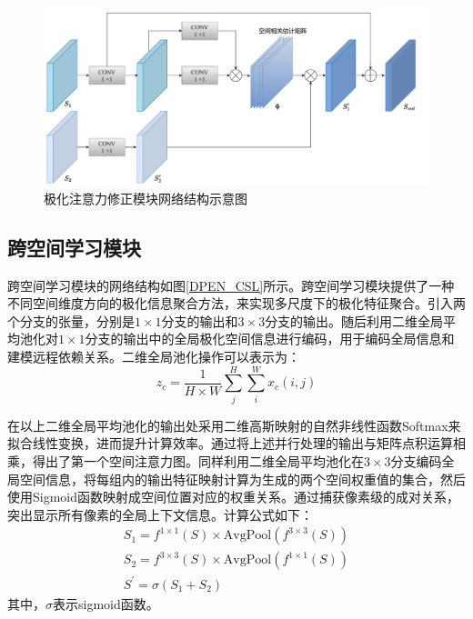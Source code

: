 \begin{figure}[h]
    \centering
    \includegraphics[width=14cm]{pic/chapter3/极化注意力修正.pdf}
    \caption{极化注意力修正模块网络结构示意图}
    \label{DPEN_WFM}
\end{figure}


\subsection{跨空间学习模块}
\label{sec:跨空间学习模块}
跨空间学习模块的网络结构如图\ref{DPEN_CSL}所示。跨空间学习模块提供了一种不同空间维度方向的极化信息聚合方法，来实现多尺度下的极化特征聚合。引入两个分支的张量，分别是$1\times 1$分支的输出和$3 \times 3$分支的输出。随后利用二维全局平均池化对$1\times 1$分支的输出中的全局极化空间信息进行编码，用于编码全局信息和建模远程依赖关系。二维全局池化操作可以表示为：
\begin{equation}
    z_c=\frac{1}{H\times W}\sum_{j}^{H}\sum_{i}^{W}x_c(i,j)
\end{equation}

在以上二维全局平均池化的输出处采用二维高斯映射的自然非线性函数Softmax来拟合线性变换，进而提升计算效率。通过将上述并行处理的输出与矩阵点积运算相乘，得出了第一个空间注意力图。同样利用二维全局平均池化在$3\times 3$分支编码全局空间信息，将每组内的输出特征映射计算为生成的两个空间权重值的集合，然后使用Sigmoid函数映射成空间位置对应的权重关系。通过捕获像素级的成对关系，突出显示所有像素的全局上下文信息。计算公式如下：
\begin{gather}
    S_1=f^{1\times 1}\left( S \right) \times \mathrm{AvgPool}\left( f^{3\times 3}\left( S \right) \right)
    \\
    S_2=f^{3\times 3}\left( S \right) \times \mathrm{AvgPool}\left( f^{1\times 1}\left( S \right) \right)
    \\
    S^{\prime}=\sigma \left( S_1+S_2 \right)
\end{gather}
其中，$\sigma$表示sigmoid函数。

